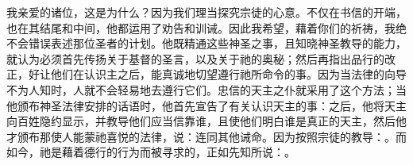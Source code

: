 我亲爱的诸位，这是为什么？因为我们理当探究宗徒的心意。不仅在书信的开端，也在其结尾和中间，他都运用了劝告和训诫。因此我希望，藉着你们的祈祷，我绝不会错误表述那位圣者的计划。他既精通这些神圣之事，且知晓神圣教导的能力，就认为必须首先传扬关于基督的圣言，以及关于祂的奥秘；然后再指出品行的改正，好让他们在认识主之后，能真诚地切望遵行祂所命令的事。因为当法律的向导不为人知时，人就不会轻易地去遵行它们。忠信的天主之仆就采用了这个方法；当他颁布神圣法律安排的话语时，他首先宣告了有关认识天主的事：之后，他将天主向百姓隐约显示，并教导他们应当信靠谁，且使他们明白谁是真正的天主，然后他才颁布那使人能蒙祂喜悦的法律，说：连同其他诫命。因为按照宗徒的教导：。而如今，祂是藉着德行的行为而被寻求的，正如先知所说：。\par

